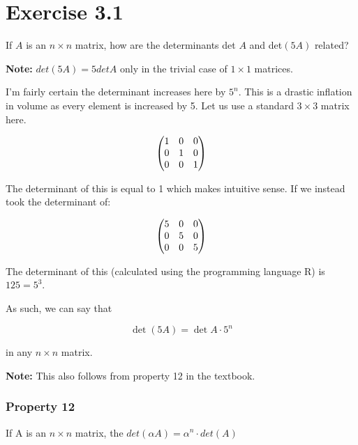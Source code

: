 \section*{Exercise 3.1}

If $A$ is an $n \times n$ matrix, how are the determinants det $A$ and det$(5A)$ related?

\textbf{Note:} $det(5A) = 5 det A$ only in the trivial case of $1 \times 1$ matrices.

I'm fairly certain the determinant increases here by $5^n$. This is a drastic inflation in volume as every element is increased by 5. Let us use a standard $3 \times 3$ matrix here. 

\[\genericmat{p}{1&0&0\\0&1&0\\0&0&1}\]

The determinant of this is equal to 1 which makes intuitive sense. If we instead took the determinant of:

\[\genericmat{p}{5&0&0\\0&5&0\\0&0&5}\]

The determinant of this (calculated using the programming language R) is $125 = 5^3$.

As such, we can say that 

\[\det(5A) = \det A \cdot 5^n\]

in any $n \times n$ matrix.

\textbf{Note:} This also follows from property 12 in the textbook.

\subsubsection{Property 12}

If A is an $n \times n$ matrix, the $det(\alpha A) = \alpha^n \cdot det(A)$
